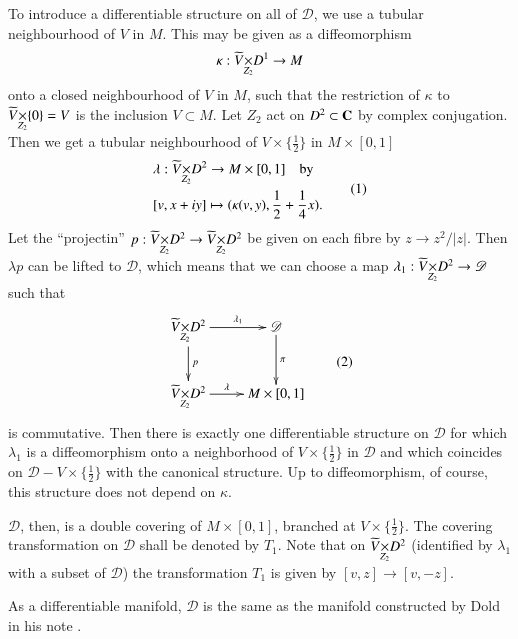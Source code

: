 To introduce a differentiable structure on all of $\mathscr{D}$, we use a tubular neighbourhood of $V$ in $M$. This may be given as a diffeomorphism
$$
\kappa : \fprod{\widetilde{V}}{D^{1}}{Z_{2}}\to M
$$
onto a closed neighbourhood of $V$ in $M$, such that the restriction of $\kappa$ to $\fprod{\widetilde{V}}{\{0\}}{Z_{2}}=V$ is the inclusion $V\subset M$. Let $Z_{2}$ act on $D^{2}\subset \mathbf{C}$ by complex conjugation. Then we get a tubular neighbourhood of $V\times \{\frac{1}{2}\}$ in $M\times [0,1]$
\begin{equation*}
\begin{split}
&\lambda : \fprod{\widetilde{V}}{D^{2}}{Z_{2}}\to M\times [0,1]\quad\text{by}\\
&[v,x+iy]\mapsto (\kappa(v,y),\frac{1}{2}+\frac{1}{4}x).
\end{split}\tag{1}
\label{art11-sec2-eq1}
\end{equation*}
Let the ``projectin'' $p:\fprod{\widetilde{V}}{D^{2}}{Z_{2}}\to \fprod{\widetilde{V}}{D^{2}}{Z_{2}}$ be given on each fibre by $z\to z^{2}/|z|$. Then $\lambda p$ can be lifted to $\mathscr{D}$, which means that we can choose a map $\lambda_{1}:\fprod{\widetilde{V}}{D^{2}}{Z_{2}}\to \mathscr{D}$ such that
\begin{equation*}
\vcenter{\xymatrix{
\fprod{\widetilde{V}}{D^{2}}{Z_{2}}\ar[d]^-{p}\ar[r]^-{\lambda_{1}} & \mathscr{D}\ar[d]^-{\pi}\\
\fprod{\widetilde{V}}{D^{2}}{Z_{2}}\ar[r]^-{\lambda} & M\times [0,1]
}}\tag{2}\label{art11-sec2-eq2}
\end{equation*}
is commutative. Then there is exactly one differentiable structure on $\mathscr{D}$ for which $\lambda_{1}$ is a diffeomorphism onto a neighborhood of $V\times \{\frac{1}{2}\}$ in $\mathscr{D}$ and which coincides on $\mathscr{D}-V\times \{\frac{1}{2}\}$ with the canonical structure. Up to diffeomorphism, of course, this structure does not depend on $\kappa$.

$\mathscr{D}$, then, is a double covering of $M\times [0,1]$, branched at $V\times \{\frac{1}{2}\}$. The covering transformation on $\mathscr{D}$ shall be denoted by $T_{1}$. Note that on $\fprod{\widetilde{V}}{D^{2}}{Z_{2}}$ (identified by $\lambda_{1}$ with a subset of $\mathscr{D}$) the transformation $T_{1}$ is given by $[v,z]\to [v,-z]$.

As a differentiable manifold, $\mathscr{D}$ is the same as the manifold constructed by Dold in his note \cite{art11-key5}.


